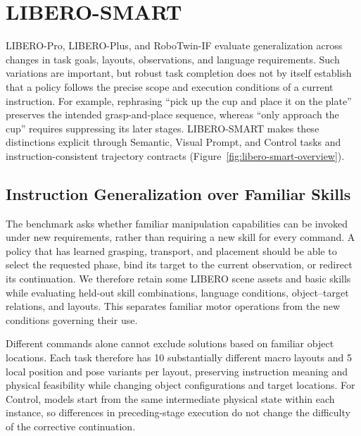 %

\hypertarget{libero-smart}{%
\section{LIBERO-SMART}\label{libero-smart}}

LIBERO-Pro, LIBERO-Plus, and RoboTwin-IF evaluate generalization across changes in task goals,
layouts, observations, and language requirements. Such variations are important, but robust task
completion does not by itself establish that a policy follows the precise scope and execution
conditions of a current instruction. For example, rephrasing ``pick up the cup and place it on the
plate'' preserves the intended grasp-and-place sequence, whereas ``only approach the cup'' requires
suppressing its later stages. LIBERO-SMART makes these distinctions explicit through Semantic,
Visual Prompt, and Control tasks and instruction-consistent trajectory contracts
(Figure~\ref{fig:libero-smart-overview}).

\hypertarget{instruction-generalization-over-familiar-skills}{%
\subsection{Instruction Generalization over Familiar
Skills}\label{instruction-generalization-over-familiar-skills}}

The benchmark asks whether familiar manipulation capabilities can be invoked under new requirements,
rather than requiring a new skill for every command. A policy that has learned grasping, transport,
and placement should be able to select the requested phase, bind its target to the current
observation, or redirect its continuation. We therefore retain some LIBERO scene assets and basic
skills while evaluating held-out skill combinations, language conditions, object--target relations,
and layouts. This separates familiar motor operations from the new conditions governing their use.

Different commands alone cannot exclude solutions based on familiar object locations. Each task
therefore has 10 substantially different macro layouts and 5 local position and pose variants per
layout, preserving instruction meaning and physical feasibility while changing object configurations
and target locations. For Control, models start from the same intermediate physical state within
each instance, so differences in preceding-stage execution do not change the difficulty of the
corrective continuation.

